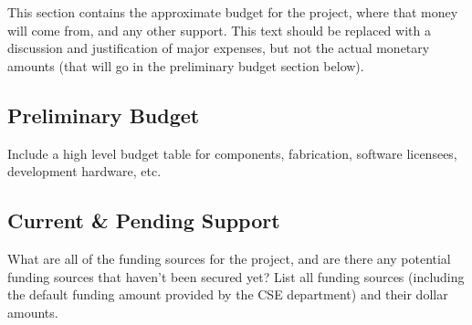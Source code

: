 This section contains the approximate budget for the project, where that money will come from, and any other support. This text should be replaced with a discussion and justification of major expenses, but not the actual monetary amounts (that will go in the preliminary budget section below). 

\subsection{Preliminary Budget}
Include a high level budget table for components, fabrication, software licensees, development hardware, etc. 

\subsection{Current \& Pending Support}
What are all of the funding sources for the project, and are there any potential funding sources that haven't been secured yet? List all funding sources (including the default funding amount provided by the CSE department) and their dollar amounts.